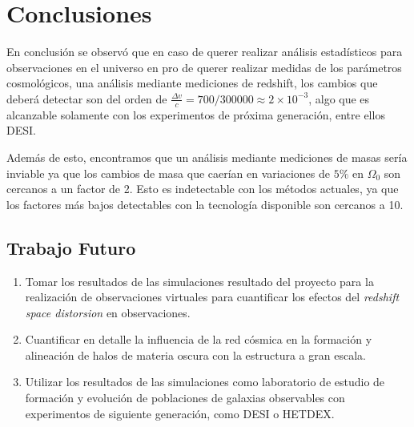\chapter{Conclusiones}
En conclusión se observó que en caso de querer realizar análisis estadísticos para observaciones en el universo en pro de querer realizar medidas de los parámetros cosmológicos, una análisis mediante mediciones de redshift, los cambios que deberá detectar son del orden de $\frac{\Delta v}{c}=700/300000\approx 2\times10^{-3}$, algo que es alcanzable solamente con los experimentos de próxima generación, entre ellos DESI. 


Además de esto, encontramos que un análisis mediante mediciones de masas sería inviable ya que los cambios de masa que caerían en variaciones de $5\%$ en $\Omega_0$ son cercanos a un factor de 2. Esto es indetectable con los métodos actuales, ya que los factores más bajos detectables con la tecnología disponible son cercanos a 10.


\section{Trabajo Futuro}
\begin{enumerate}
	\item Tomar los resultados de las simulaciones resultado del proyecto para la realización de observaciones virtuales para cuantificar los efectos del \textit{redshift space distorsion} en observaciones.
	\item Cuantificar en detalle la influencia de la red cósmica en la formación y alineación de halos de materia oscura con la estructura a gran escala.
	\item Utilizar los resultados de las simulaciones como laboratorio de estudio de formación y evolución de poblaciones de galaxias observables con experimentos de siguiente generación, como DESI o HETDEX.
\end{enumerate}